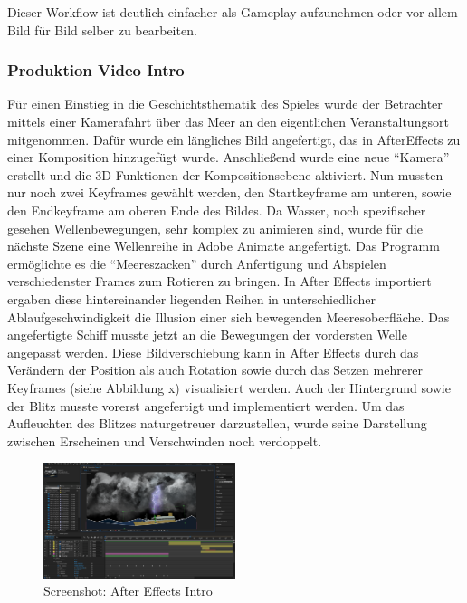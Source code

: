 Dieser Workflow ist deutlich einfacher als Gameplay aufzunehmen oder vor allem Bild für Bild selber zu bearbeiten.

\subsubsection{Produktion Video Intro}
Für einen Einstieg in die Geschichtsthematik des Spieles wurde der Betrachter mittels einer Kamerafahrt über das Meer an den eigentlichen Veranstaltungsort mitgenommen.
Dafür wurde ein längliches Bild angefertigt, das in AfterEffects zu einer Komposition hinzugefügt wurde. Anschließend wurde eine neue “Kamera” erstellt und die 3D-Funktionen der Kompositionsebene aktiviert. Nun mussten nur noch zwei Keyframes gewählt werden, den Startkeyframe am unteren, sowie den Endkeyframe am oberen Ende des Bildes.
Da Wasser, noch spezifischer gesehen Wellenbewegungen, sehr komplex zu animieren sind, wurde für die nächste Szene eine Wellenreihe in Adobe Animate angefertigt. Das Programm ermöglichte es die “Meereszacken” durch Anfertigung und Abspielen verschiedenster Frames zum Rotieren zu bringen. In After Effects importiert ergaben diese hintereinander liegenden Reihen in unterschiedlicher Ablaufgeschwindigkeit die Illusion einer sich bewegenden Meeresoberfläche. 
Das angefertigte Schiff musste jetzt an die Bewegungen der vordersten Welle angepasst werden. Diese Bildverschiebung kann in After Effects durch das Verändern der Position als auch Rotation sowie durch das Setzen mehrerer Keyframes (siehe Abbildung x) visualisiert werden. Auch der Hintergrund sowie der Blitz musste vorerst angefertigt und implementiert werden. Um das Aufleuchten des Blitzes naturgetreuer darzustellen, wurde seine Darstellung zwischen Erscheinen und Verschwinden noch verdoppelt. 

\begin{figure}
\includegraphics[width=0.5\textwidth]{../img/screenshot_aftereffects_intro.PNG}
\caption{Screenshot: After Effects Intro}
\label{fig:Screenshot: After Effects Intro}
\end{figure}